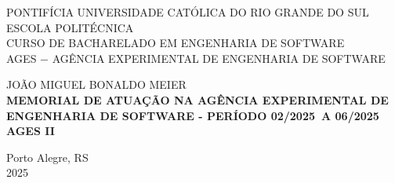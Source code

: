 \author{João Miguel}

\def\autor{\uppercase{João Miguel Bonaldo Meier}}
\def\inicio{02/2025}
\def\fim{06/2025}
\def\ages{II}
\def\local{Porto Alegre, RS}
\def\ano{2025}

\begin{capa}
  \centering
    \uppercase{
      PONTIFÍCIA UNIVERSIDADE CATÓLICA DO RIO GRANDE DO SUL\\
      ESCOLA POLITÉCNICA\\
      CURSO DE BACHARELADO EM ENGENHARIA DE SOFTWARE\\
      AGES $-$ AGÊNCIA EXPERIMENTAL DE ENGENHARIA DE SOFTWARE\\
      }

    \vfill
    \autor\\
    \vfill
    \textbf{
      \uppercase{
        Memorial de atuação na Agência Experimental de Engenharia de Software 
        {-} Período \inicio\ a \fim\
        \\AGES \ages\
      }
    }
    
    \vfill

    \vfill
    \local\\
    \ano\
  \end{capa}